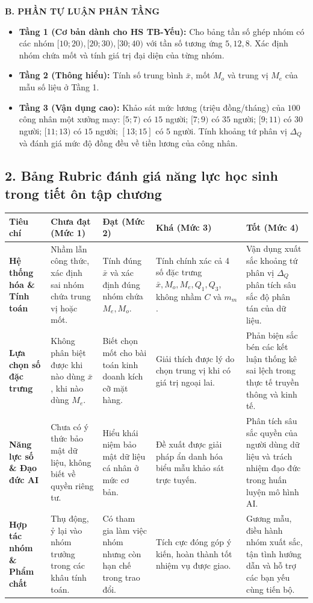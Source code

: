 \documentclass[12pt, a4paper]{article}
\begin{document}
\noindent \textbf{B. PHẦN TỰ LUẬN PHÂN TẦNG}
\begin{itemize}[leftmargin=0.6cm]
    \item \textbf{Tầng 1 (Cơ bản dành cho HS TB-Yếu):} Cho bảng tần số ghép nhóm có các nhóm $[10; 20), [20; 30), [30; 40)$ với tần số tương ứng $5, 12, 8$. Xác định nhóm chứa mốt và tính giá trị đại diện của từng nhóm.
    \item \textbf{Tầng 2 (Thông hiểu):} Tính số trung bình $\bar{x}$, mốt $M_o$ và trung vị $M_e$ của mẫu số liệu ở Tầng 1.
    \item \textbf{Tầng 3 (Vận dụng cao):} Khảo sát mức lương (triệu đồng/tháng) của $100$ công nhân một xưởng may: $[5; 7)$ có $15$ người; $[7; 9)$ có $35$ người; $[9; 11)$ có $30$ người; $[11; 13)$ có $15$ người; $[13; 15]$ có $5$ người. Tính khoảng tứ phân vị $\Delta_Q$ và đánh giá mức độ đồng đều về tiền lương của công nhân.
\end{itemize}

\subsection*{2. Bảng Rubric đánh giá năng lực học sinh trong tiết ôn tập chương}

\begin{center}
\small
\begin{tabularx}{\textwidth}{|p{2.8cm}|X|X|X|X|}
\hline
\textbf{Tiêu chí} & \textbf{Chưa đạt (Mức 1)} & \textbf{Đạt (Mức 2)} & \textbf{Khá (Mức 3)} & \textbf{Tốt (Mức 4)} \\ \hline
\textbf{Hệ thống hóa \& Tính toán} & Nhầm lẫn công thức, xác định sai nhóm chứa trung vị hoặc mốt. & Tính đúng $\bar{x}$ và xác định đúng nhóm chứa $M_e, M_o$. & Tính chính xác cả 4 số đặc trưng $\bar{x}, M_o, M_e, Q_1, Q_3$, không nhầm $C$ và $m_m$. & Vận dụng xuất sắc khoảng tứ phân vị $\Delta_Q$ phân tích sâu sắc độ phân tán của dữ liệu. \\ \hline
\textbf{Lựa chọn số đặc trưng} & Không phân biệt được khi nào dùng $\bar{x}$, khi nào dùng $M_e$. & Biết chọn mốt cho bài toán kinh doanh kích cỡ mặt hàng. & Giải thích được lý do chọn trung vị khi có giá trị ngoại lai. & Phản biện sắc bén các kết luận thống kê sai lệch trong thực tế truyền thông và kinh tế. \\ \hline
\textbf{Năng lực số \& Đạo đức AI} & Chưa có ý thức bảo mật dữ liệu, không biết về quyền riêng tư. & Hiểu khái niệm bảo mật dữ liệu cá nhân ở mức cơ bản. & Đề xuất được giải pháp ẩn danh hóa biểu mẫu khảo sát trực tuyến. & Phân tích sâu sắc quyền của người dùng dữ liệu và trách nhiệm đạo đức trong huấn luyện mô hình AI. \\ \hline
\textbf{Hợp tác nhóm \& Phẩm chất} & Thụ động, ỷ lại vào nhóm trưởng trong các khâu tính toán. & Có tham gia làm việc nhóm nhưng còn hạn chế trong trao đổi. & Tích cực đóng góp ý kiến, hoàn thành tốt nhiệm vụ được giao. & Gương mẫu, điều hành nhóm xuất sắc, tận tình hướng dẫn và hỗ trợ các bạn yếu cùng tiến bộ. \\ \hline
\end{tabularx}
\end{center}
\end{document}
